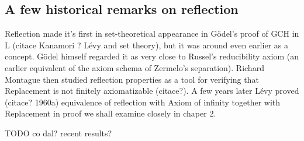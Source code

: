 \documentclass[12pt,a4paper]{article}
\begin{document}
\medskip

\subsection{A few historical remarks on reflection}\label{sec:History}  %
 
 
Reflection made it's first in set-theoretical appearance in G{\"o}del's proof of GCH in L  (citace Kanamori ? Lévy and set theory), but it was around even earlier as a concept. G{\"o}del himself regarded it as very close to Russel's reducibility axiom (an earlier equivalent of the axiom schema of Zermelo's separation). Richard Montague then studied reflection properties as a tool for verifying that Replacement is not finitely axiomatizable (citace?). A few years later Lévy proved (citace? 1960a) equivalence of reflection with Axiom of infinity together with Replacement in proof we shall examine closely in chaper 2.


TODO co dal? recent results?



% 

\end{document}
